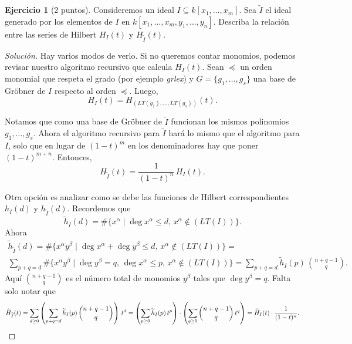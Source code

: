 \documentclass{article}
\theoremstyle{definition}
\newtheorem{ejerc}{Ejercicio}
\newenvironment{solucion}{\begin{proof}[Solución]}{\end{proof}}
\begin{document}
\begin{ejerc}[2 puntos]
  Consideremos un ideal $I \subseteq k [x_1,\ldots,x_m]$. Sea $\widetilde{I}$ el
  ideal generado por los elementos de $I$ en
  $k [x_1,\ldots,x_m,y_1,\ldots,y_n]$. Describa la relación entre las series de
  Hilbert $H_I (t)$ y $H_{\widetilde{I}} (t)$.

  \ifdefined\solutions\begin{solucion}
    Hay varios modos de verlo. Si no queremos contar monomios, podemos revisar
    nuestro algoritmo recursivo que calcula $H_I (t)$. Sean $\preceq$ un orden
    monomial que respeta el grado (por ejemplo \emph{grlex}) y
    $G = \{ g_1,\ldots,g_s \}$ una base de Gröbner de $I$ respecto al orden
    $\preceq$. Luego,
    $$H_I (t) = H_{(LT (g_1), \ldots, LT (g_s))} (t).$$

    Notamos que como una base de Gröbner de $\widetilde{I}$ funcionan los mismos
    polinomios $g_1,\ldots,g_s$. Ahora el algoritmo recursivo para
    $\widetilde{I}$ hará lo mismo que el algoritmo para $I$, solo que en lugar
    de $(1-t)^m$ en los denominadores hay que poner $(1-t)^{m+n}$. Entonces,
    $$H_{\widetilde{I}} (t) = \frac{1}{(1-t)^n}\,H_I (t).$$

    \vspace{1em}

    Otra opción es analizar como se debe las funciones de Hilbert
    correspondientes $h_I (d)$ y $h_{\widetilde{I}} (d)$. Recordemos que
    \[ \widetilde{h}_I (d) =
      \# \{ x^\alpha \mid \deg x^\alpha \le d, \, x^\alpha \notin (LT (I)) \}. \]
    Ahora
    \begin{multline*}
      \widetilde{h}_{\widetilde{I}} (d) =
      \# \{ x^\alpha y^\beta \mid \deg x^\alpha + \deg y^\beta \le d, \, x^\alpha \notin (LT (I)) \} = \\
      \sum_{p + q = d} \# \{ x^\alpha y^\beta \mid \deg y^\beta =
      q, \, \deg x^\alpha \le p, \, x^\alpha \notin (LT (I)) \} =
      \sum_{p + q = d} \widetilde{h}_I (p)\,{n + q - 1 \choose q}.
    \end{multline*}
    Aquí ${n + q - 1 \choose q}$ es el número total de monomios $y^\beta$ tales
    que $\deg y^\beta = q$. Falta solo notar que
    \[ \widetilde{H}_{\widetilde{I}} (t) =
       \sum_{d \ge 0} \left(\sum_{p + q = d} \widetilde{h}_I (p)\,{n + q - 1 \choose q}\right)\,t^d =
       \left(\sum_{p\ge 0} \widetilde{h}_I (p)\,t^p\right)\cdot \left(\sum_{q\ge 0} {n + q - 1 \choose q}\,t^q\right) =
       \widetilde{H}_I (t)\cdot \frac{1}{(1-t)^n}. \qedhere \]
   \end{solucion}\fi
\end{ejerc}
\end{document}
